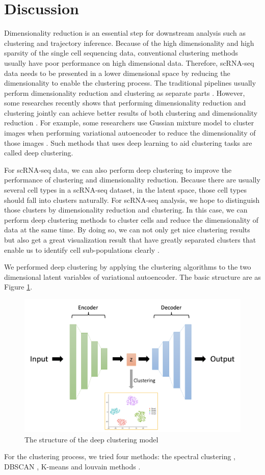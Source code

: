 \section{Discussion}
Dimensionality reduction is an essential step for downstream analysis such as clustering and trajectory inference. Because of the high dimensionality and high sparsity of the single cell sequencing data, conventional clustering methods usually have poor performance on high dimensional data. Therefore, scRNA-seq data needs to be presented in a lower dimensional space by reducing the dimensionality to enable the clustering process. The traditional pipelines usually perform dimensionality reduction and clustering as separate parts \cite{wu2020tools}. However, some researches recently shows that performing dimensionality reduction and clustering jointly can achieve better results of both clustering and dimensionality reduction \cite{yang2017towards}. For example, some researchers use Gussian mixture model to cluster images when performing variational autoencoder to reduce the dimensionality of those images \cite{prasad2020variational}. Such methods that uses deep learning to aid clustering tasks are called deep clustering.

For scRNA-seq data, we can also perform deep clustering to improve the performance of clustering and dimensionality reduction. Because there are usually several cell types in a scRNA-seq dataset, in the latent space, those cell types should fall into clusters naturally. For scRNA-seq analysis, we hope to distinguish those clusters by dimensionality reduction and clustering. In this case, we can perform deep clustering methods to cluster cells and reduce the dimensionality of data at the same time. By doing so, we can not only get nice clustering results but also get a great visualization result that have greatly separated clusters that enable us to identify cell sub-populations clearly \cite{tian2019clustering}. 

We performed deep clustering by applying the clustering algorithms to the two dimensional latent variables of variational autoencoder. The basic structure are as Figure \ref{dcstru}. 

\begin{figure}
    \centering
    \includegraphics[width=1\textwidth]{figures/myfigures/dc.png}
    \caption{The structure of the deep clustering model}
    \label{dcstru}
\end{figure}

For the clustering process, we tried four methods: the spectral clustering \cite{von2007tutorial}, DBSCAN \cite{ester1996density}, K-means \cite{kanungo2002efficient} and louvain methods \cite{traag2019louvain}.